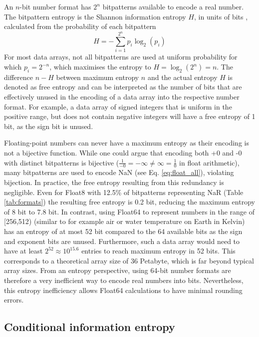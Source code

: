 An $n$-bit number format has $2^n$ bitpatterns available to encode a real number. The bitpattern entropy is the
Shannon information entropy $H$, in units of bits \citep{Shannon1948}, calculated from the probability of each bitpattern 
	\begin{equation}
	H = - \sum_{i=1}^{2^n} p_i \log_2(p_i)
	\end{equation}
For most data arrays, not all bitpatterns are used at uniform probability for which $p_i = 2^{-n}$, which maximises the entropy
to $H = \log_2(2^n) = n$. The difference $n-H$ between maximum entropy $n$ and the actual entropy $H$ is denoted as free
entropy and can be interpreted as the number of bits that are effectively unused in the encoding of a data array into the
respective number format. For example, a data array of signed integers that is uniform in the positive range, but does not
contain negative integers will have a free entropy of 1 bit, as the sign bit is unused.

Floating-point numbers can never have a maximum entropy as their encoding is not a bijective function. While one could argue
that encoding both +0 and -0 with distinct bitpatterns is bijective ($\tfrac{1}{-0} = -\infty \neq \infty = \tfrac{1}{0}$ in float arithmetic),
many bitpatterns are used to encode NaN (see Eq. \ref{eq:float_all}), violating bijection. In practice, the free entropy resulting
from this redundancy is negligible. Even for Float8 with 12.5\% of bitpatterns representing NaR (Table \ref{tab:formats}) the 
resulting free entropy is 0.2 bit, reducing the maximum entropy of 8 bit to 7.8 bit. In contrast, using Float64 to represent 
numbers in the range of [256,512) (similar to for example air or water temperature on Earth in Kelvin) has an entropy of at 
most 52 bit compared to the 64 available bits as the sign and exponent bits are unused. Furthermore, such a data array
would need to have at least $2^{52} \approx 10^{15.6}$ entries to reach maximum entropy in 52 bits. This corresponds to
a theoretical array size of 36 Petabyte, which is far beyond typical array sizes. From an entropy perspective, using 64-bit number
formats are therefore a very inefficient way to encode real numbers into bits. Nevertheless, this entropy inefficiency allows
Float64 calculations to have minimal rounding errors.

\subsection{Conditional information entropy}
\label{sec:cond_entropy}

